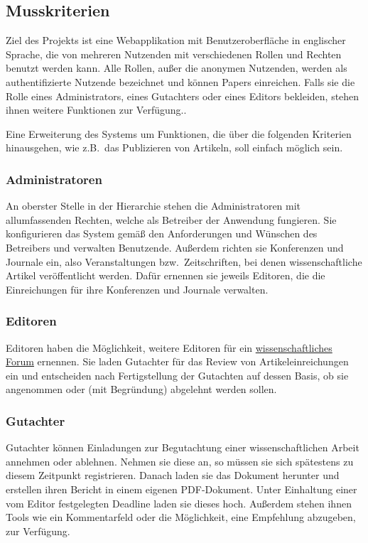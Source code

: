 
\subsection{Musskriterien}
Ziel des Projekts ist eine Webapplikation mit Benutzeroberfläche in englischer Sprache, die von mehreren Nutzenden mit verschiedenen Rollen und Rechten benutzt werden kann.
Alle Rollen, außer die anonymen Nutzenden, werden als authentifizierte Nutzende bezeichnet und können Papers einreichen.
Falls sie die Rolle eines Administrators, eines Gutachters oder eines Editors bekleiden, stehen ihnen weitere Funktionen zur Verfügung..

Eine Erweiterung des Systems um Funktionen, die über die folgenden Kriterien hinausgehen, wie z.B.\ das Publizieren von Artikeln, soll einfach möglich sein.

\subsubsection{Administratoren}\label{mkrit:admin}
An oberster Stelle in der Hierarchie stehen die Administratoren mit allumfassenden Rechten, welche als Betreiber der Anwendung fungieren.
Sie konfigurieren das System gemäß den Anforderungen und Wünschen des Betreibers und verwalten Benutzende.
Außerdem richten sie Konferenzen und Journale ein, also Veranstaltungen bzw.\ Zeitschriften, bei denen wissenschaftliche Artikel veröffentlicht werden.
Dafür ernennen sie jeweils Editoren, die die Einreichungen für ihre Konferenzen und Journale verwalten.

\subsubsection{Editoren}\label{mkrit:editor}
Editoren haben die Möglichkeit, weitere Editoren für ein \hyperref[glo:wissForum]{wissenschaftliches Forum} ernennen.
Sie laden Gutachter für das Review von Artikeleinreichungen ein und entscheiden nach Fertigstellung der Gutachten auf dessen Basis, ob sie angenommen oder (mit Begründung) abgelehnt werden sollen.

\subsubsection{Gutachter}\label{mkrit:gutachter}
Gutachter können Einladungen zur Begutachtung einer wissenschaftlichen Arbeit annehmen oder ablehnen.
Nehmen sie diese an, so müssen sie sich spätestens zu diesem Zeitpunkt registrieren.
Danach laden sie das Dokument herunter und erstellen ihren Bericht in einem eigenen PDF-Dokument.
Unter Einhaltung einer vom Editor festgelegten Deadline laden sie dieses hoch.
Außerdem stehen ihnen Tools wie ein Kommentarfeld oder die Möglichkeit, eine Empfehlung abzugeben, zur Verfügung.

